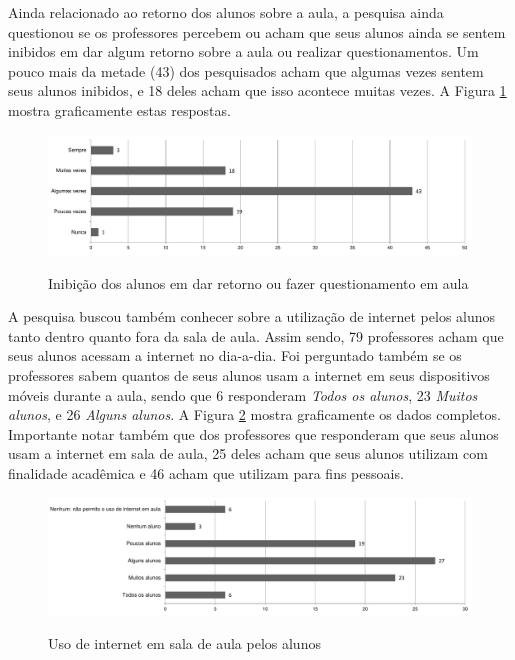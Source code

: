 Ainda relacionado ao retorno dos alunos sobre a aula, a pesquisa ainda questionou se os professores percebem ou acham que seus alunos ainda se sentem inibidos em dar algum retorno sobre a aula ou realizar questionamentos. Um pouco mais da metade (43) dos pesquisados acham que algumas vezes sentem seus alunos inibidos, e 18 deles acham que isso acontece muitas vezes. A Figura \ref{fig:grafico_inibicao} mostra graficamente estas respostas.

\begin{figure}[!h]
\centering
\caption{Inibição dos alunos em dar retorno ou fazer questionamento em aula }
\includegraphics[width=1.0\textwidth]{pdfs/professores/img-grafico-inibicao.pdf} 
\label{fig:grafico_inibicao} 
\end{figure}



A pesquisa buscou também conhecer sobre a utilização de internet pelos alunos tanto dentro quanto fora da sala de aula. Assim sendo, 79 professores acham que seus alunos acessam a internet no dia-a-dia. Foi perguntado também se os professores sabem quantos de seus alunos usam a internet em seus dispositivos móveis durante a aula, sendo que 6 responderam \emph{Todos os alunos}, 23 \emph{Muitos alunos}, e 26 \emph{Alguns alunos}. A Figura \ref{fig:grafico_internet_sala} mostra graficamente os dados completos. Importante notar também que dos professores que responderam que seus alunos usam a internet em sala de aula, 25 deles acham que seus alunos utilizam com finalidade acadêmica e 46 acham que utilizam para fins pessoais.

\begin{figure}[!h]
\centering
\caption{Uso de internet em sala de aula pelos alunos}
\includegraphics[width=1.0\textwidth]{pdfs/alunos-professores/pesquisa-uso-internet-sala.pdf} 
\label{fig:grafico_internet_sala} 
\end{figure}

